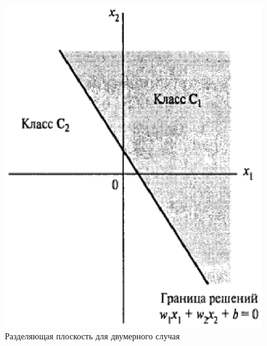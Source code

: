 \documentclass[oneside,final,14pt]{extreport}
\begin{document}
\begin{figure}[t]
    \centering
    \includegraphics{c1c2.eps}
    \caption{Разделяющая плоскость для двумерного случая}
    \label{fig:c1c2}
\end{figure}
\end{document}
